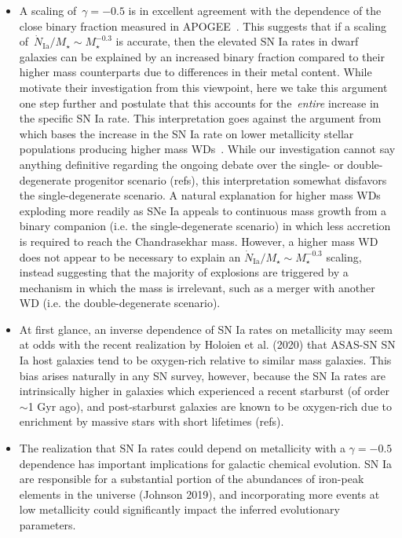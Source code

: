 \documentclass[ms.tex]{subfiles}
\begin{document}
\begin{itemize}
	\item A scaling of~$\gamma = -0.5$ is in excellent agreement with the
	dependence of the close binary fraction measured in APOGEE~\citep{Moe2019}.
	This suggests that if a scaling of~$\dot{N}_\text{Ia} / M_\star \sim
	M_\star^{-0.3}$ is accurate, then the elevated SN Ia rates in dwarf
	galaxies can be explained by an increased binary fraction compared to their
	higher mass counterparts due to differences in their metal content.
	While~\citet{Gandhi2022} motivate their investigation from this viewpoint,
	here we take this argument one step further and postulate that this
	accounts for the~\textit{entire} increase in the specific SN Ia rate.
	This interpretation goes against the argument from~\citet{Kistler2013}
	which bases the increase in the SN Ia rate on lower metallicity stellar
	populations producing higher mass WDs~\citep{Umeda1999, Willson2000,
	Marigo2007, Meng2008, Zhao2012, Kalirai2014}.
	While our investigation cannot say anything definitive regarding the
	ongoing debate over the single- or double-degenerate progenitor scenario
	{\color{red} (refs)}, this interpretation somewhat disfavors the
	single-degenerate scenario.
	A natural explanation for higher mass WDs exploding more readily as SNe Ia
	appeals to continuous mass growth from a binary companion (i.e. the
	single-degenerate scenario) in which less accretion is required to reach
	the Chandrasekhar mass.
	However, a higher mass WD does not appear to be necessary to explain an
	$\dot{N}_\text{Ia} / M_\star \sim M_\star^{-0.3}$ scaling, instead
	suggesting that the majority of explosions are triggered by a mechanism
	in which the mass is irrelevant, such as a merger with another WD (i.e.
	the double-degenerate scenario).

	\item At first glance, an inverse dependence of SN Ia rates on metallicity
	may seem at odds with the recent realization by {\color{red} Holoien et al.
	(2020)} that ASAS-SN SN Ia host galaxies tend to be oxygen-rich relative to
	similar mass galaxies.
	This bias arises naturally in any SN survey, however, because the SN Ia
	rates are intrinsically higher in galaxies which experienced a recent
	starburst (of order~$\sim$1 Gyr ago), and post-starburst galaxies are
	known to be oxygen-rich due to enrichment by massive stars with short
	lifetimes {\color{red} (refs)}.

	\item The realization that SN Ia rates could depend on metallicity with a
	$\gamma = -0.5$ dependence has important implications for galactic chemical
	evolution.
	SN Ia are responsible for a substantial portion of the abundances of
	iron-peak elements in the universe {\color{red} (Johnson 2019)}, and
	incorporating more events at low metallicity could significantly impact the
	inferred evolutionary parameters.

\end{itemize}
\end{document}
